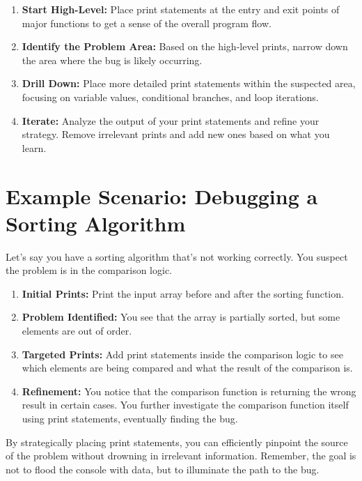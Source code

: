 \documentclass{article}
\begin{document}
\begin{enumerate}
    \item \textbf{Start High-Level:} Place print statements at the entry and exit points of major functions to get a sense of the overall program flow.
    \item \textbf{Identify the Problem Area:} Based on the high-level prints, narrow down the area where the bug is likely occurring.
    \item \textbf{Drill Down:} Place more detailed print statements within the suspected area, focusing on variable values, conditional branches, and loop iterations.
    \item \textbf{Iterate:} Analyze the output of your print statements and refine your strategy.  Remove irrelevant prints and add new ones based on what you learn.
\end{enumerate}

\section*{Example Scenario: Debugging a Sorting Algorithm}

Let's say you have a sorting algorithm that's not working correctly. You suspect the problem is in the comparison logic.

\begin{enumerate}
    \item \textbf{Initial Prints:} Print the input array before and after the sorting function.
    \item \textbf{Problem Identified:} You see that the array is partially sorted, but some elements are out of order.
    \item \textbf{Targeted Prints:}  Add print statements inside the comparison logic to see which elements are being compared and what the result of the comparison is.
    \item \textbf{Refinement:} You notice that the comparison function is returning the wrong result in certain cases. You further investigate the comparison function itself using print statements, eventually finding the bug.
\end{enumerate}

By strategically placing print statements, you can efficiently pinpoint the source of the problem without drowning in irrelevant information. Remember, the goal is not to flood the console with data, but to illuminate the path to the bug.

\newpage
\end{document}
